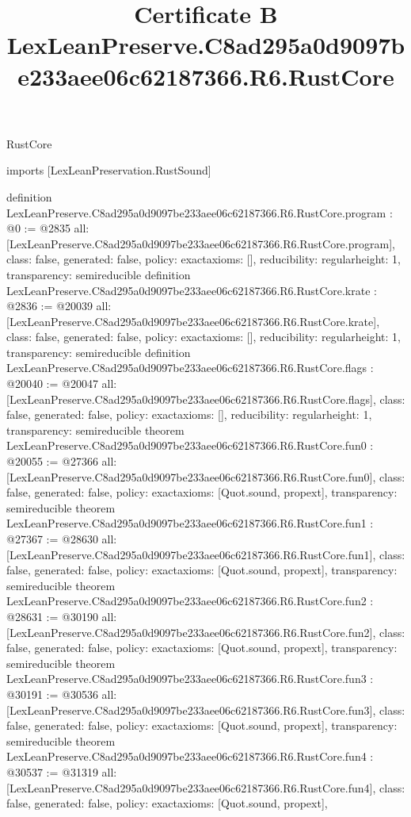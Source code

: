 \begin{lexlean}{RustCore}
\title{Certificate B LexLeanPreserve.C8ad295a0d9097be233aee06c62187366.R6.RustCore}
\begin{coremodule}
imports [LexLeanPreservation.RustSound]

definition LexLeanPreserve.C8ad295a0d9097be233aee06c62187366.R6.RustCore.program : @0 := @2835 {
  all: [LexLeanPreserve.C8ad295a0d9097be233aee06c62187366.R6.RustCore.program],
  class: false,
  generated: false,
  policy: exact{axioms: []},
  reducibility: regular{height: 1},
  transparency: semireducible
}
definition LexLeanPreserve.C8ad295a0d9097be233aee06c62187366.R6.RustCore.krate : @2836 := @20039 {
  all: [LexLeanPreserve.C8ad295a0d9097be233aee06c62187366.R6.RustCore.krate],
  class: false,
  generated: false,
  policy: exact{axioms: []},
  reducibility: regular{height: 1},
  transparency: semireducible
}
definition LexLeanPreserve.C8ad295a0d9097be233aee06c62187366.R6.RustCore.flags : @20040 := @20047 {
  all: [LexLeanPreserve.C8ad295a0d9097be233aee06c62187366.R6.RustCore.flags],
  class: false,
  generated: false,
  policy: exact{axioms: []},
  reducibility: regular{height: 1},
  transparency: semireducible
}
theorem LexLeanPreserve.C8ad295a0d9097be233aee06c62187366.R6.RustCore.fun0 : @20055 := @27366 {
  all: [LexLeanPreserve.C8ad295a0d9097be233aee06c62187366.R6.RustCore.fun0],
  class: false,
  generated: false,
  policy: exact{axioms: [Quot.sound, propext]},
  transparency: semireducible
}
theorem LexLeanPreserve.C8ad295a0d9097be233aee06c62187366.R6.RustCore.fun1 : @27367 := @28630 {
  all: [LexLeanPreserve.C8ad295a0d9097be233aee06c62187366.R6.RustCore.fun1],
  class: false,
  generated: false,
  policy: exact{axioms: [Quot.sound, propext]},
  transparency: semireducible
}
theorem LexLeanPreserve.C8ad295a0d9097be233aee06c62187366.R6.RustCore.fun2 : @28631 := @30190 {
  all: [LexLeanPreserve.C8ad295a0d9097be233aee06c62187366.R6.RustCore.fun2],
  class: false,
  generated: false,
  policy: exact{axioms: [Quot.sound, propext]},
  transparency: semireducible
}
theorem LexLeanPreserve.C8ad295a0d9097be233aee06c62187366.R6.RustCore.fun3 : @30191 := @30536 {
  all: [LexLeanPreserve.C8ad295a0d9097be233aee06c62187366.R6.RustCore.fun3],
  class: false,
  generated: false,
  policy: exact{axioms: [Quot.sound, propext]},
  transparency: semireducible
}
theorem LexLeanPreserve.C8ad295a0d9097be233aee06c62187366.R6.RustCore.fun4 : @30537 := @31319 {
  all: [LexLeanPreserve.C8ad295a0d9097be233aee06c62187366.R6.RustCore.fun4],
  class: false,
  generated: false,
  policy: exact{axioms: [Quot.sound, propext]},
}
\end{coremodule}
\end{lexlean}
